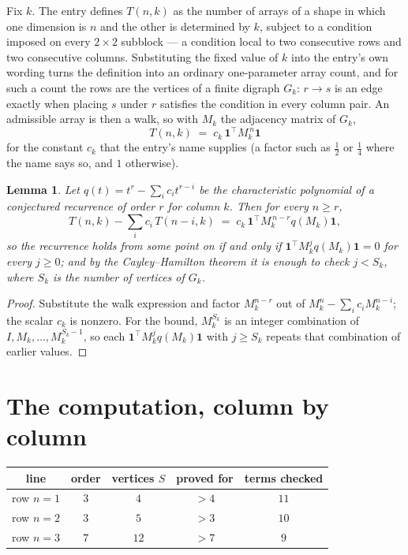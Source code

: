 \documentclass[11pt,a4paper]{article}
\theoremstyle{plain}
\newtheorem{lemma}[theorem]{Lemma}
\theoremstyle{definition}
\begin{document}
Fix $k$. The entry defines $T(n,k)$ as the number of arrays of a shape in which one dimension
is $n$ and the other is determined by $k$, subject to a condition imposed on every
$2\times2$ subblock --- a condition local to two consecutive rows and two consecutive columns.
Substituting the fixed value of $k$ into the entry's own wording turns the definition into an
ordinary one-parameter array count, and for such a count the rows are the vertices of a finite
digraph $G_k$: $r\to s$ is an edge exactly when placing $s$ under $r$ satisfies the condition
in every column pair. An admissible array is then a walk, so with $M_k$ the adjacency matrix
of $G_k$,
\[
T(n,k)\;=\;c_k\,\mathbf{1}^{\!\top}M_k^{\,n}\mathbf{1}
\]
for the constant $c_k$ that the entry's name supplies (a factor such as $\tfrac12$ or
$\tfrac14$ where the name says so, and $1$ otherwise).

\begin{lemma}\label{lem:crit}
Let $q(t)=t^{r}-\sum_i c_it^{r-i}$ be the characteristic polynomial of a conjectured
recurrence of order $r$ for column $k$. Then for every $n\ge r$,
\[
T(n,k)-\sum_i c_i\,T(n-i,k)\;=\;c_k\,\mathbf{1}^{\!\top}M_k^{\,n-r}q(M_k)\mathbf{1},
\]
so the recurrence holds from some point on if and only if
$\mathbf{1}^{\!\top}M_k^{j}q(M_k)\mathbf{1}=0$ for every $j\ge0$; and by the
Cayley--Hamilton theorem it is enough to check $j<S_k$, where $S_k$ is the number of vertices
of $G_k$.
\end{lemma}

\begin{proof}
Substitute the walk expression and factor $M_k^{n-r}$ out of $M_k^{n}-\sum_ic_iM_k^{n-i}$;
the scalar $c_k$ is nonzero. For the bound, $M_k^{S_k}$ is an integer combination of
$I,M_k,\dots,M_k^{S_k-1}$, so each $\mathbf{1}^{\!\top}M_k^{j}q(M_k)\mathbf{1}$ with
$j\ge S_k$ repeats that combination of earlier values.
\end{proof}

\section{The computation, column by column}

\begin{center}
\begin{tabular}{ccccc}
line & order & vertices $S$ & proved for & terms checked \\ \hline
row $n$$=1$ & $3$ & $4$ & $>4$ & $11$ \\
row $n$$=2$ & $3$ & $5$ & $>3$ & $10$ \\
row $n$$=3$ & $7$ & $12$ & $>7$ & $9$ \\
\end{tabular}
\end{center}
\end{document}
